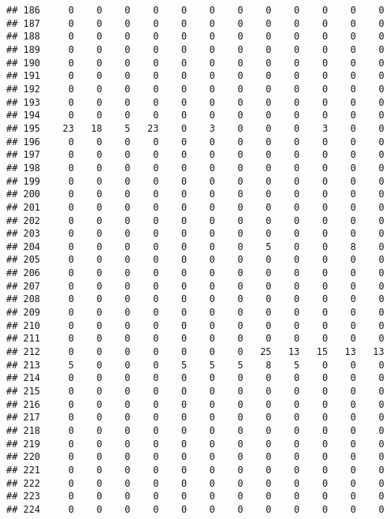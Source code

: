 \documentclass[]{article}
\begin{document}
\begin{verbatim}
## 186     0    0    0    0    0    0    0    0    0    0    0    0
## 187     0    0    0    0    0    0    0    0    0    0    0    0
## 188     0    0    0    0    0    0    0    0    0    0    0    0
## 189     0    0    0    0    0    0    0    0    0    0    0    0
## 190     0    0    0    0    0    0    0    0    0    0    0    0
## 191     0    0    0    0    0    0    0    0    0    0    0    0
## 192     0    0    0    0    0    0    0    0    0    0    0    0
## 193     0    0    0    0    0    0    0    0    0    0    0    0
## 194     0    0    0    0    0    0    0    0    0    0    0    0
## 195    23   18    5   23    0    3    0    0    0    3    0    0
## 196     0    0    0    0    0    0    0    0    0    0    0    0
## 197     0    0    0    0    0    0    0    0    0    0    0    0
## 198     0    0    0    0    0    0    0    0    0    0    0    0
## 199     0    0    0    0    0    0    0    0    0    0    0    0
## 200     0    0    0    0    0    0    0    0    0    0    0    0
## 201     0    0    0    0    0    0    0    0    0    0    0    0
## 202     0    0    0    0    0    0    0    0    0    0    0    0
## 203     0    0    0    0    0    0    0    0    0    0    0    0
## 204     0    0    0    0    0    0    0    5    0    0    8    0
## 205     0    0    0    0    0    0    0    0    0    0    0    0
## 206     0    0    0    0    0    0    0    0    0    0    0    0
## 207     0    0    0    0    0    0    0    0    0    0    0    0
## 208     0    0    0    0    0    0    0    0    0    0    0    0
## 209     0    0    0    0    0    0    0    0    0    0    0    0
## 210     0    0    0    0    0    0    0    0    0    0    0    0
## 211     0    0    0    0    0    0    0    0    0    0    0    0
## 212     0    0    0    0    0    0    0   25   13   15   13   13
## 213     5    0    0    0    5    5    5    8    5    0    0    0
## 214     0    0    0    0    0    0    0    0    0    0    0    0
## 215     0    0    0    0    0    0    0    0    0    0    0    0
## 216     0    0    0    0    0    0    0    0    0    0    0    0
## 217     0    0    0    0    0    0    0    0    0    0    0    0
## 218     0    0    0    0    0    0    0    0    0    0    0    0
## 219     0    0    0    0    0    0    0    0    0    0    0    0
## 220     0    0    0    0    0    0    0    0    0    0    0    0
## 221     0    0    0    0    0    0    0    0    0    0    0    0
## 222     0    0    0    0    0    0    0    0    0    0    0    0
## 223     0    0    0    0    0    0    0    0    0    0    0    0
## 224     0    0    0    0    0    0    0    0    0    0    0    0

\end{verbatim}
\end{document}
